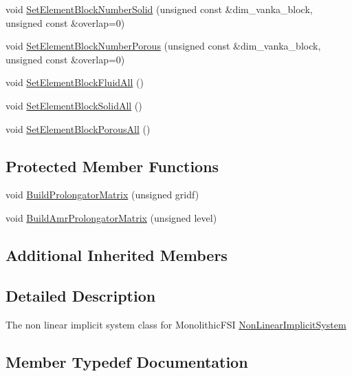 \begin{DoxyCompactItemize}
void \mbox{\hyperlink{classfemus_1_1_monolithic_f_s_i_non_linear_implicit_system_ad26a581b8a1b1d904017e8968a935d05}{Set\+Element\+Block\+Number\+Solid}} (unsigned const \&dim\+\_\+vanka\+\_\+block, unsigned const \&overlap=0)
\item 
void \mbox{\hyperlink{classfemus_1_1_monolithic_f_s_i_non_linear_implicit_system_afd36ebc591e5aaa4b883fba31acd7849}{Set\+Element\+Block\+Number\+Porous}} (unsigned const \&dim\+\_\+vanka\+\_\+block, unsigned const \&overlap=0)
\item 
void \mbox{\hyperlink{classfemus_1_1_monolithic_f_s_i_non_linear_implicit_system_a5402f0414a74756b39cffa39d6249832}{Set\+Element\+Block\+Fluid\+All}} ()
\item 
void \mbox{\hyperlink{classfemus_1_1_monolithic_f_s_i_non_linear_implicit_system_a49a2d1a651bbe3e878407f54d1467a4c}{Set\+Element\+Block\+Solid\+All}} ()
\item 
void \mbox{\hyperlink{classfemus_1_1_monolithic_f_s_i_non_linear_implicit_system_ae07bacaf97587c02f72c8087e34379a9}{Set\+Element\+Block\+Porous\+All}} ()
\end{DoxyCompactItemize}
\subsection*{Protected Member Functions}
\begin{DoxyCompactItemize}
\item 
void \mbox{\hyperlink{classfemus_1_1_monolithic_f_s_i_non_linear_implicit_system_a664d35fce8341c54261d838490a35aa4}{Build\+Prolongator\+Matrix}} (unsigned gridf)
\item 
void \mbox{\hyperlink{classfemus_1_1_monolithic_f_s_i_non_linear_implicit_system_a3012c718ac458d1f658b421460829c4b}{Build\+Amr\+Prolongator\+Matrix}} (unsigned level)
\end{DoxyCompactItemize}
\subsection*{Additional Inherited Members}


\subsection{Detailed Description}
The non linear implicit system class for Monolithic\+F\+SI \mbox{\hyperlink{classfemus_1_1_non_linear_implicit_system}{Non\+Linear\+Implicit\+System}} 

\subsection{Member Typedef Documentation}
\mbox{\label{classfemus_1_1_monolithic_f_s_i_non_linear_implicit_system_ac9effcc16eb9a19fa306a9e5f078569b}} 
